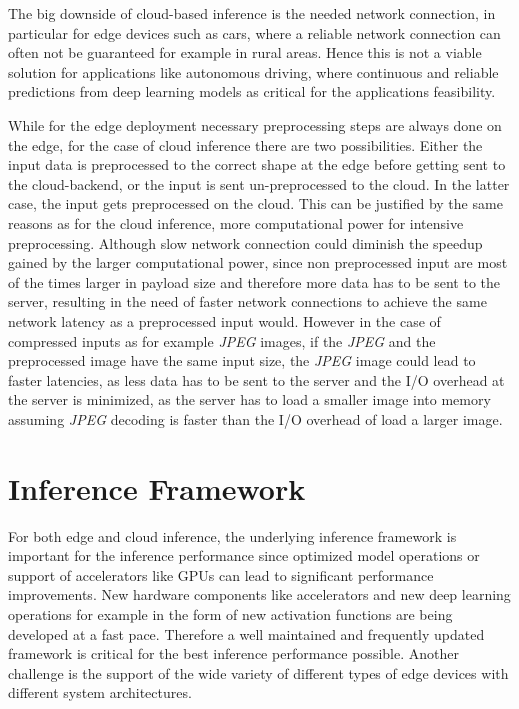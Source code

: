 The big downside of cloud-based inference is the needed network connection, in particular for edge devices such as cars, where a reliable network connection can often not be guaranteed for example in rural areas. Hence this is not a viable solution for applications like autonomous driving, where continuous and reliable predictions from deep learning models as critical for the applications feasibility.

While for the edge deployment necessary preprocessing steps are always done on the edge, for the case of cloud inference there are two possibilities. Either the input data is preprocessed to the correct shape at the edge before getting sent to the cloud-backend, or the input is sent un-preprocessed to the cloud. 
In the latter case, the input gets preprocessed on the cloud. 
This can be justified by the same reasons as for the cloud inference, more computational power for intensive preprocessing.
Although slow network connection could diminish the speedup gained by the larger computational power, since non preprocessed input are most of the times larger in payload size and therefore more data has to be sent to the server, resulting in the need of faster network connections to achieve the same network latency as a preprocessed input would.
However in the case of compressed inputs as for example \emph{JPEG} images, if the \emph{JPEG} and the preprocessed image have the same input size, the \emph{JPEG} image could lead to faster latencies, as less data has to be sent to the server and the I/O overhead at the server is minimized, as the server has to load a smaller image into memory assuming \emph{JPEG} decoding is faster than the I/O overhead of load a larger image. 



\section{Inference Framework}
For both edge and cloud inference, the underlying inference framework is important for the inference performance since optimized model operations or support of accelerators like GPUs can lead to significant performance improvements.
New hardware components like accelerators and new deep learning operations for example in the form of new activation functions are being developed at a fast pace. Therefore a well maintained and frequently updated framework is critical for the best inference performance possible.
Another challenge is the support of the wide variety of different types of edge devices with different system architectures.

